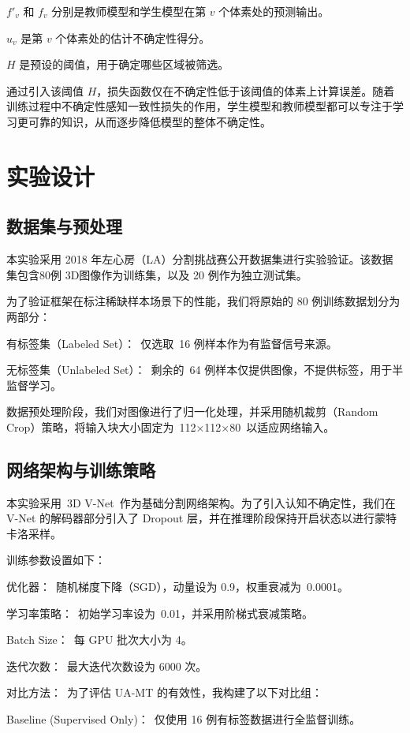 \documentclass[twoside,openright]{xduugthesis}
\begin{document}
$f'_v$ 和 $f_v$ 分别是教师模型和学生模型在第 $v$ 个体素处的预测输出。

$u_v$ 是第 $v$ 个体素处的估计不确定性得分。

$H$ 是预设的阈值，用于确定哪些区域被筛选。

通过引入该阈值 $H$，损失函数仅在不确定性低于该阈值的体素上计算误差。随着训练过程中不确定性感知一致性损失的作用，学生模型和教师模型都可以专注于学习更可靠的知识，从而逐步降低模型的整体不确定性。

\section{实验设计}
\subsection{数据集与预处理}
本实验采用 2018 年左心房（LA）分割挑战赛公开数据集进行实验验证。该数据集包含80例 3D图像作为训练集，以及 20 例作为独立测试集。

为了验证框架在标注稀缺样本场景下的性能，我们将原始的 80 例训练数据划分为两部分：

有标签集（Labeled Set）： 仅选取 16 例样本作为有监督信号来源。

无标签集（Unlabeled Set）： 剩余的 64 例样本仅提供图像，不提供标签，用于半监督学习。

数据预处理阶段，我们对图像进行了归一化处理，并采用随机裁剪（Random Crop）策略，将输入块大小固定为 112×112×80 以适应网络输入。

\subsection{网络架构与训练策略}

本实验采用 3D V-Net 作为基础分割网络架构。为了引入认知不确定性，我们在 V-Net 的解码器部分引入了 Dropout 层，并在推理阶段保持开启状态以进行蒙特卡洛采样。

训练参数设置如下：

优化器： 随机梯度下降（SGD），动量设为 0.9，权重衰减为 0.0001。

学习率策略： 初始学习率设为 0.01，并采用阶梯式衰减策略。

Batch Size： 每 GPU 批次大小为 4。

迭代次数： 最大迭代次数设为 6000 次。

对比方法： 为了评估 UA-MT 的有效性，我构建了以下对比组：

Baseline (Supervised Only)： 仅使用 16 例有标签数据进行全监督训练。
\end{document}
